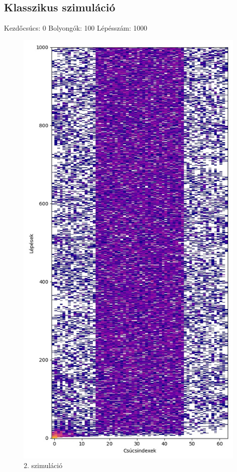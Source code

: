 \documentclass[14pt,a4paper]{article}
\begin{document}
\subsection{Klasszikus szimuláció}
Kezdőcsúcs: 0
Bolyongók: 100
Lépésszám: 1000
\begin{figure}[H]
\centering
\includegraphics[width = 0.7\columnwidth]{sim02.jpg}
\caption{2. szimuláció}
\end{figure}
\end{document}
